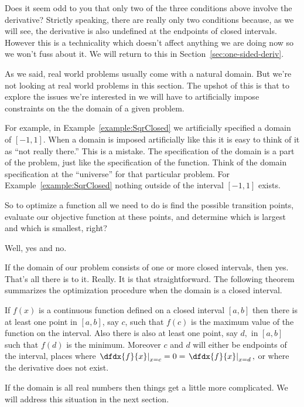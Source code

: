 Does it seem odd to you that only two of the three conditions above
involve the derivative? Strictly speaking, there are really only two
conditions because, as we will see, the derivative is also undefined
at the endpoints of closed intervals. However this is a technicality
which doesn't affect anything we are doing now so we won't fuss about
it. We will return to this in Section~\ref{sec:one-sided-deriv}.

As we said, real world problems usually come with a natural
domain. But we're not looking at real world problems in this section.
The upshot of this is that to explore the issues we're interested in
we will have to artificially impose constraints on the the domain of a
given problem.

For example, in Example~\ref{example:SqrClosed} we artificially
specified a domain of $[-1,1]$. When a domain is imposed artificially
like this it is easy to think of it as ``not really there.'' This is a
mistake. The specification of the domain is a part of the problem,
just like the specification of the function. Think of the domain
specification at the ``universe'' for that particular problem. For
Example~\ref{example:SqrClosed} nothing outside of the interval
$[-1,1]$ exists.


So to optimize a function all we need to do is find the possible
transition points, evaluate our objective function at these points,
and determine which is largest and which is smallest, right?

Well, yes and no.

If the domain of our problem consists of one or more closed intervals, then
yes. That's all there is to it. Really. It is that
straightforward. The following theorem summarizes the
optimization procedure when the domain is a closed interval.

\begin{mytheorem} 
  \label{thm:max-min}
  If $f(x)$ is a continuous function defined on a closed interval
  $[a,b]$ then there is at least one point in $[a,b]$, say
  $c$, such that $f(c)$ is the
  maximum value of the function on the interval. Also there is also at least
  one point, say $d,$ in $[a,b]$ such that $f(d)$ is the
  minimum. Moreover $c$ and $d$ will either be endpoints of the interval,
  places where   $\left.\dfdx{f}{x}\right|_{x=c} = 0 =
  \left.\dfdx{f}{x}\right|_{x=d},$ or where the derivative does not exist.
\end{mytheorem}
If the domain is all real numbers then things get a little more
complicated. We will address this situation in the next section.

